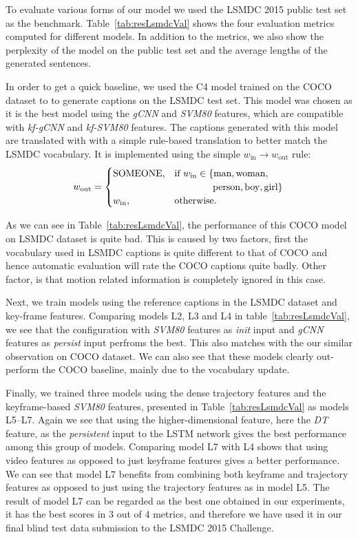 To evaluate various forms of our model we used the LSMDC 2015 public test
set as the benchmark. 
Table~\ref{tab:resLsmdcVal} shows the four evaluation metrics computed for different
models.
In addition to the metrics, we also show the perplexity of the model on the
public test set and the average lengths of the generated sentences.

In order to get a quick baseline, we used the C4 model trained on the COCO
dataset to to generate captions on the LSMDC test set.
This model was chosen as it is the best model using the \emph{gCNN} and
\emph{SVM80} features, which are compatible with \emph{kf-gCNN} and
\emph{kf-SVM80} features.
The captions generated with this model are translated with with a simple
rule-based translation to better match the LSMDC vocabulary.
It is implemented using the simple%
$w_{\text{in}} \longrightarrow w_{\text{out}}$ rule:
\begin{align} \label{eqTrans} w_{\text{out}} = \begin{cases} \text{SOMEONE},&
\text{if } w_{\text{in}} \in \{\text{man}, \text{woman}, \\&
\text{\mbox{\qquad\qquad person}}, \text{boy}, \text{girl} \}\\ w_{\text{in}},&
\text{otherwise.} \end{cases} \end{align}

As we can see in Table~\ref{tab:resLsmdcVal}, the performance of this COCO model
on LSMDC dataset is quite bad.
This is caused by two factors, first the vocabulary used in LSMDC captions is
quite different to that of COCO and hence automatic evaluation will rate the
COCO captions quite badly.
Other factor, is that motion related information is completely ignored in this
case.

Next, we train models using the reference captions in the LSMDC dataset and
key-frame features.
Comparing models L2, L3 and L4 in table~\ref{tab:resLsmdcVal}, we see that
the configuration with \emph{SVM80} features as \emph{init} input and
\emph{gCNN} features as \emph{persist} input perfroms the best.
This also matches with the our similar observation on COCO dataset.
We can also see that these models clearly out-perform the COCO baseline, mainly
due to the vocabulary update.

Finally, we trained three models using the dense trajectory features and the
keyframe-based \emph{SVM80} features, presented in Table~\ref{tab:resLsmdcVal}
as models L5--L7. 
Again we see that using the higher-dimensional feature, here the \emph{DT}
feature, as the \emph{persistent} input to the LSTM network gives the best
performance among this group of models.
Comparing model L7 with L4 shows that using video features as opposed to just
keyframe features gives a better performance.
We can see that model L7 benefits from combining both keyframe and trajectory
features as opposed to just using the trajectory features as in model L5.
The result of model L7 can be regarded as the best one obtained in our
experiments, it has the best scores in 3 out of 4 metrics, and therefore we have
used it in our final blind test data submission to the LSMDC 2015 Challenge.

